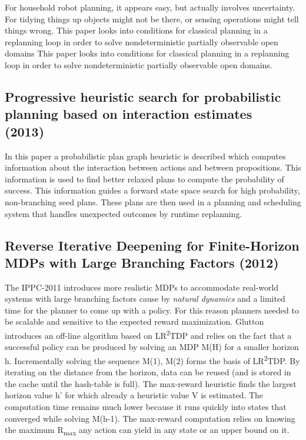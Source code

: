 \documentclass[runningheads,a4paper]{llncs}
\begin{document}
For household robot planning, it appears easy, but actually involves
uncertainty. For tidying things up objects might not be there, or sensing
operations might tell things wrong. This paper looks into conditions for
classical planning in a replanning loop in order to solve nondeterministic
partially observable open domains This paper looks into conditions for
classical planning in a replanning loop in order to solve nondeterministic
partially observable open domains.

\subsection{Progressive heuristic search for probabilistic planning based on interaction estimates (2013)~\cite{martin2013progressive}}

In this paper a probabilistic plan graph heuristic is described which computes
information about the interaction between actions and between propositions.
This information is used to find better relaxed plans to compute the
probability of success. This information guides a forward state space search
for high probability, non-branching seed plans. These plans are then used in
a planning and scheduling system that handles unexpected outcomes by runtime
replanning.



\subsection{Reverse Iterative Deepening for Finite-Horizon MDPs with Large Branching Factors (2012)~\cite{kolobov2012glutton}}
The IPPC-2011 introduces more realistic MDPs to accommodate real-world systems with large branching factors cause by \emph{natural dynamics} and a limited time for the planner to come up with a policy. For this reason planners needed to be scalable and sensitive to the expected reward maximization. Glutton introduces an off-line algorithm based on LR\textsuperscript{2}TDP and relies on the fact that a successful policy can be produced by solving an MDP M(H) for a smaller horizon h.  Incrementally solving the sequence M(1), M(2) forms the basis of LR\textsuperscript{2}TDP. By iterating on the distance from the horizon, data can be reused (and is stored in the cache until the hash-table is full). The max-reward heuristic finds the largest horizon value h' for which already a heuristic value V is estimated. The  computation time remains much lower because it runs quickly into states that converged while solving M(h-1). The max-reward computation relies on knowing the maximum R\textsubscript{max} any action can yield in any state or an upper bound on it.
\end{document}
